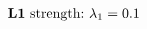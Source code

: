 \documentclass[preview]{standalone}
\begin{document}
\begin{align*}
\text{\textbf{L1} strength:\ }\lambda_1 = 0.1 \quad
\end{align*}
\end{document}
